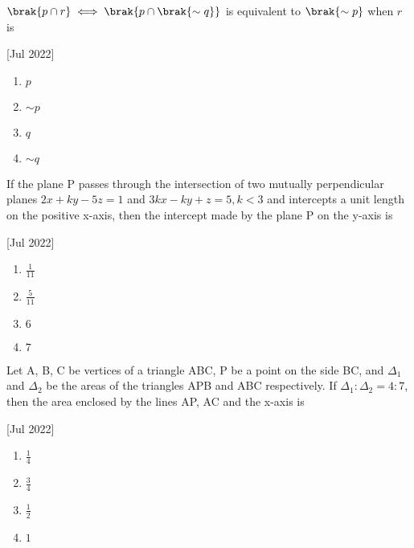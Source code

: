 \iffalse
	\title{2022}
	\author{AI24BTECH11003}
	\section{mcq-single}
\fi

    \item $\brak{p\cap r}\iff \brak{p\cap\brak{\sim q}}$ is equivalent to $\brak{\sim p}$ when $r$ is
    
    \hfill[Jul 2022]

        \begin{multicols}{4}
            \begin{enumerate}
                \item $p$
                \item $\sim p$
                \item $q$
                \item $\sim q$
            \end{enumerate}
        \end{multicols}

    \item If the plane P passes through the intersection of two mutually perpendicular planes $2x+ky-5z=1$ and $3kx-ky+z=5,k<3$ and intercepts a unit length on the positive x-axis, then the intercept made by the plane P on the y-axis is 
    
    \hfill[Jul 2022]

		\begin{multicols}{4}
			\begin{enumerate}
				\item $\frac{1}{11}$
				\item $\frac{5}{11}$
				\item $6$
				\item $7$
			\end{enumerate}
		\end{multicols}

    \item Let A, B, C be vertices of a triangle ABC, P be a point on the side BC, and $\Delta_1$ and $\Delta_2$ be the areas of the triangles APB and ABC respectively. If $\Delta_1:\Delta_2=4:7$, then the area enclosed by the lines AP, AC and the x-axis is
    
    \hfill[Jul 2022]

        \begin{multicols}{4}
            \begin{enumerate}
                \item $\frac{1}{4}$
                \item $\frac{3}{4}$
                \item $\frac{1}{2}$
                \item $1$
            \end{enumerate}
        \end{multicols}

